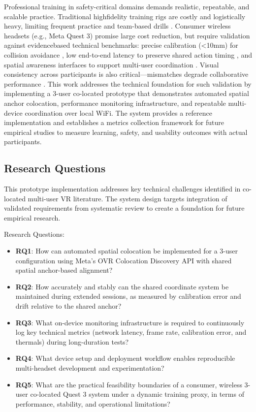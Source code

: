 \documentclass[conference]{IEEEtran}
\begin{document}
Professional training in safety-critical domains demands realistic, repeatable, and scalable practice. Traditional highfidelity training rigs are costly and logistically heavy, limiting frequent practice and team-based drills \cite{SharmaSharad2025IASR}. Consumer wireless headsets (e.g., Meta Quest 3) promise large cost reduction, but require validation against evidencebased technical benchmarks: precise calibration (\textless10mm) for collision avoidance \cite{ReimerDennis2021CfSV}, low end-to-end latency to preserve shared action timing \cite{VanDammeSam2024Iolo}, and spatial awareness interfaces to support multi-user coordination \cite{ChenLei2024Eoep}. Visual consistency across participants is also critical—mismatches degrade collaborative performance \cite{WeissYannick2025ItEo}. This work addresses the technical foundation for such validation by implementing a 3-user co-located prototype that demonstrates automated spatial anchor colocation, performance monitoring infrastructure, and repeatable multi-device coordination over local WiFi. The system provides a reference implementation and establishes a metrics collection framework for future empirical studies to measure learning, safety, and usability outcomes with actual participants.

\subsection{Research Questions}
This prototype implementation addresses key technical challenges identified in co-located multi-user VR literature. The system design targets integration of validated requirements from systematic review to create a foundation for future empirical research.

Research Questions:
\begin{itemize}
    \item \textbf{RQ1}: How can automated spatial colocation be implemented for a 3-user configuration using Meta's OVR Colocation Discovery API with shared spatial anchor-based alignment?~\cite{MetaColocationDiscovery2025,MetaSharedSpatialAnchors2025}
    \item \textbf{RQ2}: How accurately and stably can the shared coordinate system be maintained during extended sessions, as measured by calibration error and drift relative to the shared anchor?
    \item \textbf{RQ3}: What on-device monitoring infrastructure is required to continuously log key technical metrics (network latency, frame rate, calibration error, and thermals) during long-duration tests?
    \item \textbf{RQ4}: What device setup and deployment workflow enables reproducible multi-headset development and experimentation?
    \item \textbf{RQ5}: What are the practical feasibility boundaries of a consumer, wireless 3-user co-located Quest 3 system under a dynamic training proxy, in terms of performance, stability, and operational limitations?
\end{itemize}
\end{document}
